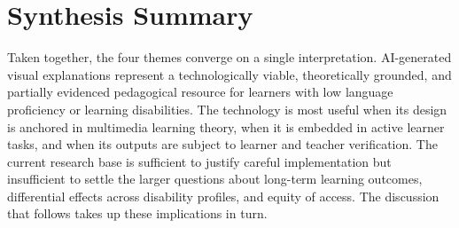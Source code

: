 \section{Synthesis Summary}

Taken together, the four themes converge on a single interpretation. AI-generated visual explanations represent a technologically viable, theoretically grounded, and partially evidenced pedagogical resource for learners with low language proficiency or learning disabilities. The technology is most useful when its design is anchored in multimedia learning theory, when it is embedded in active learner tasks, and when its outputs are subject to learner and teacher verification. The current research base is sufficient to justify careful implementation but insufficient to settle the larger questions about long-term learning outcomes, differential effects across disability profiles, and equity of access. The discussion that follows takes up these implications in turn.
